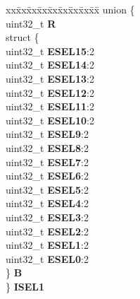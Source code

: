 \begin{DoxyCompactItemize}
\begin{tabbing}
\end{tabbing}\item 
\mbox{\label{structSIU__tag_ababce78cea4efde3e550252c1d6742e8}} 
\begin{tabbing}
xx\=xx\=xx\=xx\=xx\=xx\=xx\=xx\=xx\=\kill
union \{\\
\>uint32\_t {\bfseries R}\\
\>struct \{\\
\>\>uint32\_t {\bfseries ESEL15}:2\\
\>\>uint32\_t {\bfseries ESEL14}:2\\
\>\>uint32\_t {\bfseries ESEL13}:2\\
\>\>uint32\_t {\bfseries ESEL12}:2\\
\>\>uint32\_t {\bfseries ESEL11}:2\\
\>\>uint32\_t {\bfseries ESEL10}:2\\
\>\>uint32\_t {\bfseries ESEL9}:2\\
\>\>uint32\_t {\bfseries ESEL8}:2\\
\>\>uint32\_t {\bfseries ESEL7}:2\\
\>\>uint32\_t {\bfseries ESEL6}:2\\
\>\>uint32\_t {\bfseries ESEL5}:2\\
\>\>uint32\_t {\bfseries ESEL4}:2\\
\>\>uint32\_t {\bfseries ESEL3}:2\\
\>\>uint32\_t {\bfseries ESEL2}:2\\
\>\>uint32\_t {\bfseries ESEL1}:2\\
\>\>uint32\_t {\bfseries ESEL0}:2\\
\>\} {\bfseries B}\\
\} {\bfseries ISEL1}\\


\end{tabbing}
\end{DoxyCompactItemize}
